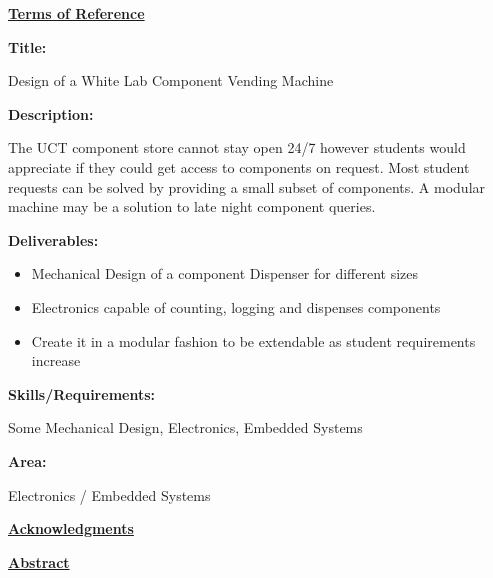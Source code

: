 \documentclass[a4paper,11pt]{article}
\numberwithin{figure}{section}
\numberwithin{table}{section}
\begin{document}
	{\centering\Huge\bfseries\underline{Terms of Reference}\par}
	{\Large\bfseries{Title:}\par}
	Design of a White Lab Component Vending Machine\par
	{\Large\bfseries{Description:}\par}
	The UCT component store cannot stay open 24/7 however students would
appreciate if they could get access to components on request. Most student requests can be solved by providing a small subset of components. A modular machine may be a solution to late night component queries.\par
	{\Large\bfseries{Deliverables:}\par}
	{\begin{itemize}
	\item Mechanical Design of a component Dispenser for different sizes
	\item Electronics capable of counting, logging and dispenses components
	\item Create it in a modular fashion to be extendable as student
requirements increase
	\end{itemize}}
	{\Large\bfseries{Skills/Requirements:}\par}
	Some Mechanical Design, Electronics, Embedded Systems\par
	{\Large\bfseries{Area:}\par}
	Electronics / Embedded Systems\par
	\newpage
	{\centering\Huge\bfseries\underline{Acknowledgments}\par}
	\newpage
	
	{\centering\Huge\bfseries\underline{Abstract}\par}
	\newpage	
	\tableofcontents
	\newpage
	\listoffigures
	\newpage
	\listoftables
	\newpage
	
	\mbox{}
	\printnomenclature[2cm]	
	
\end{document}

